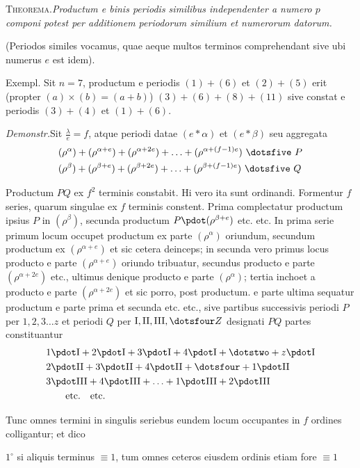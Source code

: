 \textsc{Theorema.}\quad\emph{Productum e binis periodis similibus independenter a numero $p$ componi potest per additionem periodorum similium et numerorum datorum.}

(Periodos similes vocamus, quae aeque multos terminos comprehendant sive ubi numerus $e$ est idem).

Exempl. Sit $n=7$, productum e periodis $(1)+(6)$ et $(2)+(5)$ erit (propter $(a)\times(b)=(a+b)$) $(3)+(6)+(8)+(11)$ sive constat e periodis $(3)+(4)$ et $(1)+(6)$.

\emph{Demonstr.}\quad Sit $\frac{\lambda}{e}=f$, atque periodi datae $(e\ast\alpha)$ et $(e\ast\beta)$ seu aggregata
\[
\begin{aligned}
&(\rho^\alpha)+(\rho^{\alpha+e})+(\rho^{\alpha+2e})+\ldots+(\rho^{\alpha+(f-1)e})\ \dotsfive\ P\\
&(\rho^\beta)+(\rho^{\beta+e})+(\rho^{\beta+2e})+\ldots+(\rho^{\beta+(f-1)e})\ \dotsfive\ Q
\end{aligned}
\]

Productum $PQ$ ex $f^2$ terminis constabit. Hi vero ita sunt ordinandi. Formentur $f$ series, quarum singulae ex $f$ terminis constent. Prima complectatur productum ipsius $P$ in $(\rho^\beta)$, secunda productum $P\pdot(\rho^{\beta+e})$ etc. etc. In prima serie primum locum occupet productum ex parte $(\rho^\alpha)$ oriundum, secundum productum ex $(\rho^{\alpha+e})$ et sic cetera deinceps; in secunda vero primus locus producto e parte $(\rho^{\alpha+e})$ oriundo tribuatur, secundus producto e parte $(\rho^{\alpha+2e})$ etc., ultimus denique producto e parte $(\rho^\alpha)$; tertia inchoet a producto e parte $(\rho^{\alpha+2e})$ et sic porro, post productum. e parte ultima sequatur productum e parte prima et secunda etc. etc., sive partibus successivis periodi $P$ per $1,2,3\ldots z$ et periodi $Q$ per $\mathrm{I},\mathrm{II},\mathrm{III},\dotsfour Z$ designati $PQ$ partes constituantur
\[
\begin{aligned}
&1\pdot\mathrm{I}+2\pdot\mathrm{I}+3\pdot\mathrm{I}+4\pdot\mathrm{I}+\dotstwo+z\pdot\mathrm{I}\\
&2\pdot\mathrm{II}+3\pdot\mathrm{II}+4\pdot\mathrm{II}+\dotsfour+1\pdot\mathrm{II}\\
&3\pdot\mathrm{III}+4\pdot\mathrm{III}+\ldots+1\pdot\mathrm{III}+2\pdot\mathrm{III}\\
&\qquad\text{etc.}\quad\text{etc.}
\end{aligned}
\]

Tunc omnes termini in singulis seriebus eundem locum occupantes in $f$ ordines colligantur; et dico
\par\noindent $1^\circ$ si aliquis terminus $\equiv1$, tum omnes ceteros eiusdem ordinis etiam fore $\equiv1$

